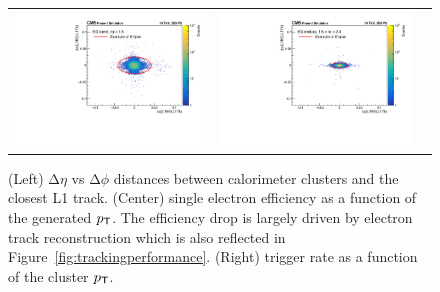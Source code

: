  \begin{figure}[tbh!]
 \begin{center}
  \begin{tabular}{ccc}
   \includegraphics[width=.45\linewidth]{figures/Part2/Upgrade/DR_barrel_new}&
   \includegraphics[width=.45\linewidth]{figures/Part2/Upgrade/DR_endcap_new}&
  \end{tabular}
  \caption{(Left) $\mathrm{\Delta}\eta$ vs $\mathrm{\Delta}\phi$ distances between calorimeter clusters and the closest L1 track. (Center) single electron efficiency as a function of the generated $p_{\textsf{T}}$. The efficiency drop is largely driven by electron track reconstruction which is also reflected in Figure~\ref{fig:trackingperformance}. (Right) trigger rate as a function of the cluster $p_{\textsf{T}}$.}
 \label{fig:DR_electron}
 \end{center}
\end{figure}

